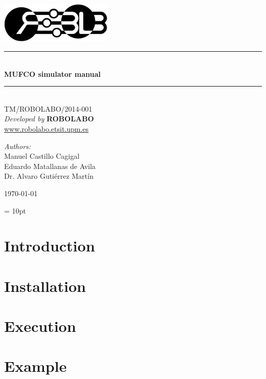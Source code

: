 \documentclass[a4paper, oneside, 11pt]{article}
\newcommand{\HRule}{\rule{\linewidth}{0.5mm}}
\begin{document}
\begin{titlepage}
\begin{center}
\includegraphics[width=0.4\textwidth]{./robolabo_logo}\\[1.5cm]
\HRule \\[0.4cm]
{ \huge \bfseries MUFCO simulator manual \\[0.4cm] }
\HRule \\[1.5cm]
{\Large
TM/ROBOLABO/2014-001\\[1.5cm]
\emph{Developed by} {\bf ROBOLABO} \\[0.3cm]
}
\href{www.robolabo.etsit.upm.es}{www.robolabo.etsit.upm.es}
\vfill
\begin{flushleft} \large
\emph{Authors:}\\
Manuel Castillo Cagigal\\
Eduardo Matallanas de Avila\\
Dr. Alvaro Guti\'errez Mart\'in
\end{flushleft}
\vspace{1.0cm}
{\large \today}
\end{center}
\end{titlepage}

\newpage
\tableofcontents
\newpage 

\baselineskip=15pt
\parskip = 10pt
\marginsize{3cm}{3cm}{2cm}{2cm}

\section{Introduction}

\section{Installation}

\section{Execution}

\section{Example}
\end{document}
